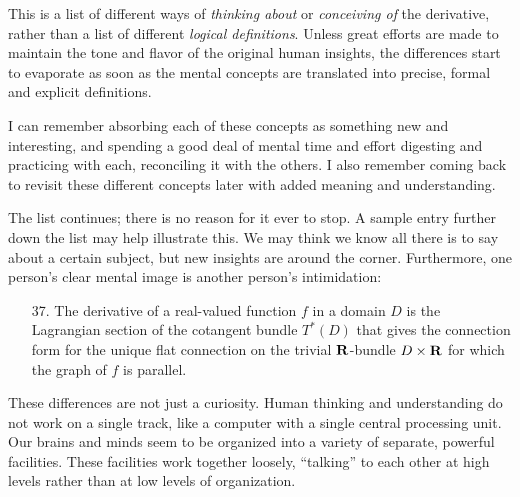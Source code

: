 \documentclass[12pt,oneside]{amsart}
\begin{document}
This is a list of different
ways of {\it thinking about} or {\it conceiving of} the 
derivative,
rather than a list of different {\it logical definitions}. 
Unless great efforts are made to maintain the tone and 
flavor of
the original human insights, the differences start to 
evaporate as
soon as the mental concepts are translated into 
precise, formal and explicit definitions.

I can remember absorbing each of these concepts as 
something new and interesting, and spending a good deal of 
mental
time and effort digesting and practicing with each,
reconciling it with the others.  I also remember coming 
back to
revisit these different concepts later with added meaning 
and understanding.

The list continues; there is no reason for it ever to stop.
A sample entry further down the list may help illustrate 
this.  We may
think we know all there is to say about a certain subject,
but new insights are around the corner. Furthermore, one 
person's clear
mental image is another person's intimidation:
\begin{enumerate}
\item[37.]
The derivative of a real-valued function $f$ in a domain $D$
is the Lagrangian section of the cotangent bundle $T^*(D)$
that gives the connection form for the unique flat 
connection on the trivial
$\bold R$-bundle $D \times \bold R$ for which the graph of 
$f$ is parallel.
\end{enumerate}

These differences are not just a curiosity.  Human 
thinking and 
understanding do not work on a single track, like a 
computer with a 
single central processing unit.  Our brains and minds seem 
to be
organized into a variety of separate, powerful facilities.
These facilities work together loosely, ``talking'' to each 
other at
high levels rather than at low levels of organization.
\end{document}
